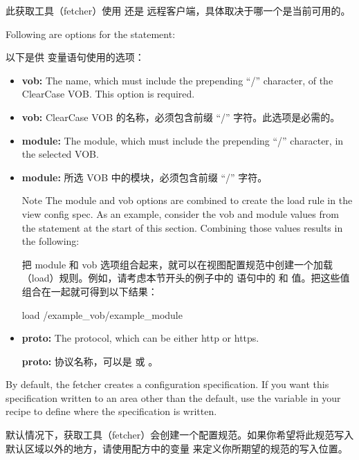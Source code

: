 此获取工具（fetcher）使用  还是  远程客户端，具体取决于哪一个是当前可用的。

Following are options for the  statement:

以下是供  变量语句使用的选项：

\begin{itemize}
\setlength\itemsep{1.0em}
\item \textbf{vob:} The name, which must include the prepending ``/'' character, of the ClearCase VOB. This option is required.
\item \textbf{vob:} ClearCase VOB 的名称，必须包含前缀 ``/'' 字符。此选项是必需的。

\item \textbf{module:} The module, which must include the prepending ``/'' character, in the selected VOB.
\item \textbf{module:} 所选 VOB 中的模块，必须包含前缀 ``/'' 字符。
\begin{noteblock}{Note}%
The module and vob options are combined to create the load rule in the view config spec. As an example, consider the vob and module values from the  statement at the start of this section. Combining those values results in the following:

\medskip
把 module 和 vob 选项组合起来，就可以在视图配置规范中创建一个加载（load）规则。例如，请考虑本节开头的例子中的  语句中的  和  值。把这些值组合在一起就可得到以下结果：

\begin{pyglist}
load /example_vob/example_module
\end{pyglist}
\end{noteblock}

\item \textbf{proto:} The protocol, which can be either http or https.

\medskip
\textbf{proto:} 协议名称，可以是  或 。
\end{itemize}

By default, the fetcher creates a configuration specification. If you want this specification written to an area other than the default, use the  variable in your recipe to define where the specification is written.

默认情况下，获取工具（fetcher）会创建一个配置规范。如果你希望将此规范写入默认区域以外的地方，请使用配方中的变量  来定义你所期望的规范的写入位置。

